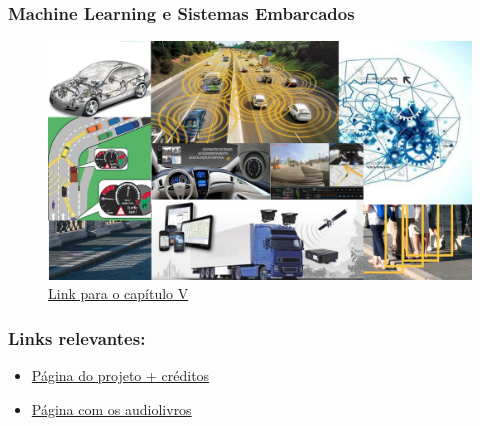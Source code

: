 \documentclass{beamer}
\begin{document}
\begin{frame}

    \frametitle{Machine Learning e Sistemas Embarcados}
    \begin{figure}[ht]
        \centering
        \includegraphics[scale=0.5]{Capitulo5.png}
        \caption{\href{./capitulos/Capitulo_05/Capitulo05.pdf}{Link para o capítulo V}}
    \end{figure}

\end{frame}
\begin{frame}

    \frametitle{Links relevantes:}
    \begin{itemize}
        \item \href{https://mysterys337.github.io/Trabalho-LDO-ML/}{Página do projeto + créditos}
        \item \href{https://soundcloud.com/gustavo-rodrigues-468052117/sets/ldo-machine-learning}{Página com os audiolivros}
    \end{itemize}
\end{frame}
\end{document}
